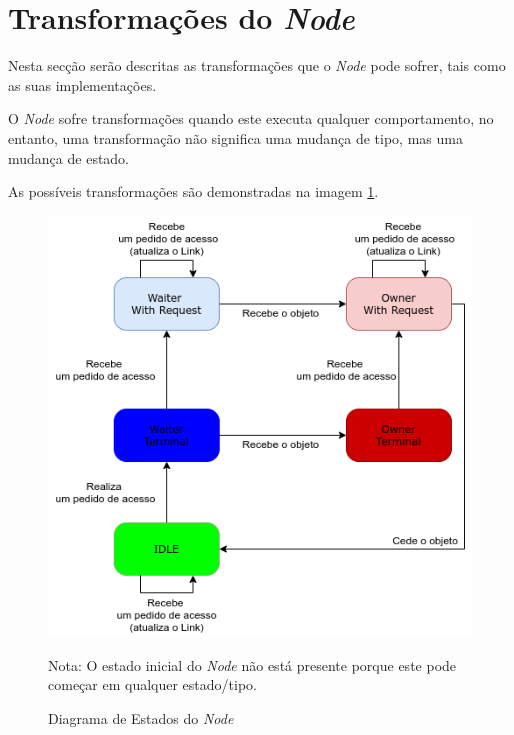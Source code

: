 \section{Transformações do \emph{Node}}
\label{implementacao:sec:transformacoes}



Nesta secção serão descritas as transformações que o \emph{Node}
pode sofrer, tais como as suas implementações.


O \emph{Node} sofre transformações quando este executa qualquer comportamento, 
no entanto, uma transformação não significa uma mudança de tipo,
mas uma mudança de estado.

As possíveis transformações são demonstradas na imagem \ref{implementacao:img:state_diagram}.

\begin{figure}[H]
\centering
\includegraphics[width=1.0\textwidth]{state-diagram.png}
\caption{Diagrama de Estados do \emph{Node}}
Nota: O estado inicial do \emph{Node} não está presente porque este pode começar em qualquer estado/tipo.
\label{implementacao:img:state_diagram}
\end{figure}


